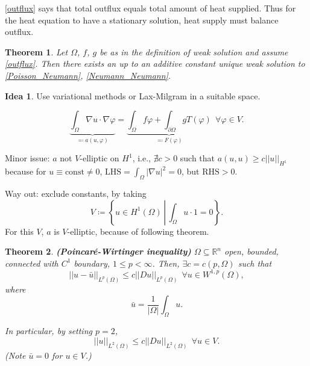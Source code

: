 \documentclass[12pt]{article}
\newtheorem{theorem}{Theorem}[section]
\theoremstyle{definition}
\newtheorem*{idea}{Idea}
\begin{document}
\eqref{outflux} says that total outflux equals total amount of heat supplied. Thus for the heat equation to have a stationary solution, heat supply must balance outflux.

\begin{theorem}\label{Neumann_existence}
Let $\Omega$, $f$, $g$ be as in the definition of weak solution and assume \eqref{outflux}. Then there exists an up to an additive constant unique weak solution to \eqref{Poisson_Neumann}, \eqref{Neumann_Neumann}.
\end{theorem}

\begin{idea}
Use variational methods or Lax-Milgram in a suitable space.
\end{idea}
\[\underbrace{\int_{\Omega}\nabla u\cdot\nabla\varphi}_{\eqqcolon a(u,\varphi)}=\underbrace{\int_{\Omega}f\varphi+\int_{\partial\Omega}gT(\varphi)}_{\eqqcolon F(\varphi)}\ \ \forall\varphi\in V.\]

Minor issue: $a$ not $V$-elliptic on $H^1$, i.e., $\nexists c>0$ such that $a(u,u)\geq c||u||_{H^1}$ because for $u\equiv\text{const}\neq0$, $\text{LHS}=\int_{\Omega}|\nabla u|^2=0$, but $\text{RHS}>0$.

Way out: exclude constants, by taking
\begin{equation}\tag{$**$}\label{exclude_constants}
V\coloneqq\left\{u\in H^1(\Omega)\,\left|\,\int_{\Omega}u\cdot1=0\right.\right\}.
\end{equation}
For this $V$, $a$ is $V$-elliptic, because of following theorem.

\begin{theorem}
\emph{\textbf{(Poincar\'{e}-Wirtinger inequality)}} $\Omega\subseteq\mathbb{R}^n$ open, bounded, connected with $C^1$ boundary, $1\leq p<\infty$. Then, $\exists c=c(p,\Omega)$ such that
\[||u-\bar{u}||_{L^p(\Omega)}\leq c||Du||_{L^p(\Omega)}\ \ \forall u\in W^{1,p}(\Omega),\]
where
\[\bar{u}=\frac{1}{|\Omega|}\int_{\Omega}u.\]

In particular, by setting $p=2$,
\[||u||_{L^2(\Omega)}\leq c||Du||_{L^2(\Omega)}\ \ \forall u\in V.\]
(Note $\bar{u}=0$ for $u\in V$.)
\end{theorem}
\end{document}
